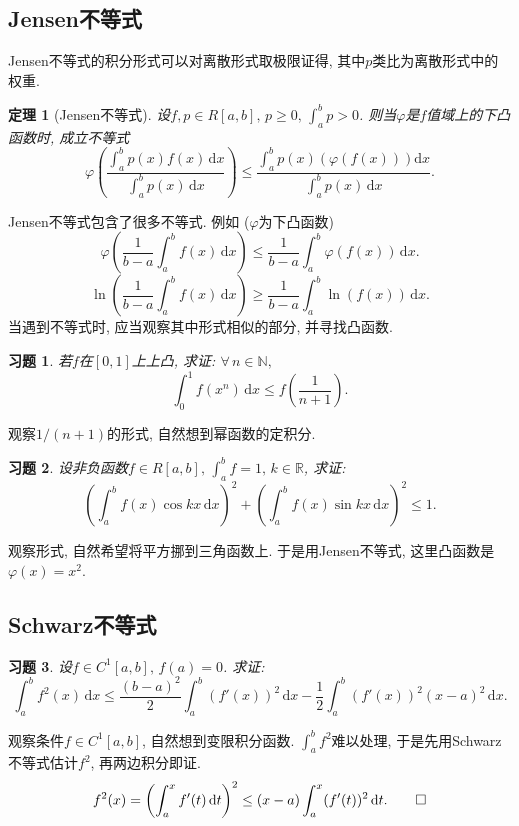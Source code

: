 \documentclass[11pt,a4paper]{ctexart}
\makeatletter
\theoremstyle{thmseries} %
\newtheorem{thm}{定理}[section]
\theoremstyle{exerseries}
\newtheorem{exer}{习题}[section]
\renewenvironment{proof}[1][\proofname]{\par
  \pushQED{\qed}%
  \normalfont \topsep6\p@\@plus6\p@\relax
  \trivlist
  \item[\hskip\labelsep
        \itshape
    #1\@addpunct{}]\ignorespaces
}{%
  \popQED\endtrivlist\@endpefalse
}
\newenvironment{pf}{\begin{proof}[\bfseries\upshape 证\quad]}{\end{proof}}
\newcommand{\bra}[1]{\mathopen{}\left(#1\right)}
\renewcommand{\phi}{\varphi}
\newcommand{\R}{\mathbb{R}}
\newcommand{\N}{\mathbb{N}}
\renewcommand{\d}{\mathrm{d}}
\makeatother
\begin{document}
\subsection{Jensen不等式}
Jensen不等式的积分形式可以对离散形式取极限证得, 其中$p$类比为离散形式中的权重. 
\begin{thm}[Jensen不等式]
	设$f,p\in R[a,b],\,p\geq0,\,\int_{a}^{b}p>0$. 则当$\phi$是$f$值域上的下凸函数时, 成立不等式
	\[\phi\bra{\frac{\int_{a}^{b}p(x)f(x)\,\d x}{\int_{a}^{b}p(x)\,\d x}}\leq\frac{\int_{a}^{b}p(x)\bra{\phi(f(x))}\d x}{\int_{a}^{b}p(x)\,\d x}.\]
\end{thm}

Jensen不等式包含了很多不等式. 例如 ($\phi$为下凸函数)
\[\phi\bra{\frac{1}{b-a}\int_{a}^{b}f(x)\,\d x}\leq\frac{1}{b-a}\int_{a}^{b}\phi(f(x))\,\d x.\]
\[\ln\bra{\frac{1}{b-a}\int_{a}^{b}f(x)\,\d x}\geq\frac{1}{b-a}\int_{a}^{b}\ln(f(x))\,\d x.\]
当遇到不等式时, 应当观察其中形式相似的部分, 并寻找凸函数. 

\begin{exer}
	若$f$在$[0,1]$上上凸, 求证: $\forall\,n\in\N,$
	\[\int_{0}^{1}f(x^n)\,\d x\leq f\bra{\frac{1}{n+1}}.\]
\end{exer}
\begin{pf}
	观察$1/(n+1)$的形式, 自然想到幂函数的定积分. 
\end{pf}

\begin{exer}
	设非负函数$f\in R[a,b],\,\int_{a}^{b}f=1,\,k\in\R$, 求证:
	\[\bra{\int_{a}^{b}f(x)\cos kx\,\d x}^2+\bra{\int_{a}^{b}f(x)\sin kx\,\d x}^2\leq1.\]
\end{exer}
\begin{pf}
	观察形式, 自然希望将平方挪到三角函数上. 于是用Jensen不等式, 这里凸函数是$\phi(x)=x^2$. 
\end{pf}

\subsection{Schwarz不等式}
\begin{exer}
	设$f\in C^1[a,b],\,f(a)=0$. 求证:
	\[\int_{a}^{b}f^2(x)\,\d x\leq\frac{(b-a)^2}{2}\int_{a}^{b}(f'(x))^2\,\d x-\frac{1}{2}\int_{a}^{b}(f'(x))^2(x-a)^2\,\d x.\]
\end{exer}
\begin{pf}
	观察条件$f\in C^1[a,b]$, 自然想到变限积分函数. $\int_{a}^{b} f^2$难以处理, 于是先用Schwarz不等式估计$f^2$, 再两边积分即证. 
	\[f^2(x)=\bra{\int_{a}^{x}f'(t)\,\d t}^2\leq(x-a)\int_{a}^{x}(f'(t))^2\,\d t.\qedhere\]
\end{pf}
\end{document}
